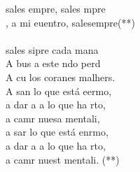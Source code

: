 \begin{cancion}%
	 sales empre, sales mpre\\
	, a mi euentro, salesempre(**)\\
\jump\\
	sales sipre cada mana\\
	A bus a este ndo perd\\
	A cu los coranes malhers.\\
	A san lo que está eermo,\\
	a dar a a lo que ha rto,\\
	a camr nuesa mentali,\\
	a sar lo que está enrmo,\\
	a dar a a lo que ha rto,\\
	a camr nuest mentali. (**)\\
\end{cancion}%

